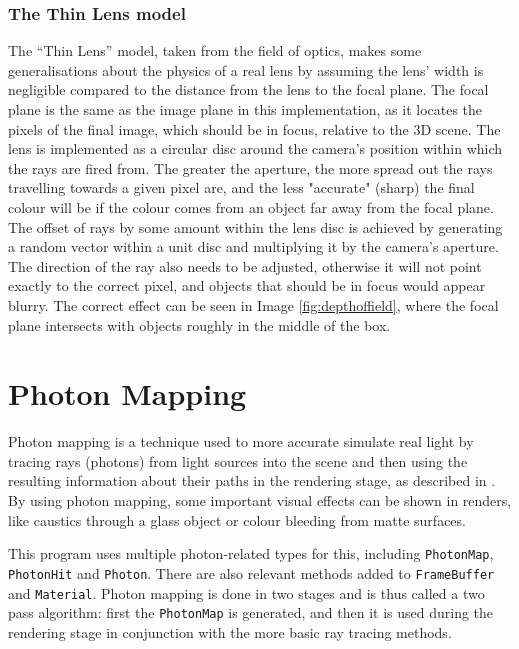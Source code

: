\documentclass[a4paper]{article}
\begin{document}
\subsubsection{The Thin Lens model}
The ``Thin Lens'' model, taken from the field of optics, makes some generalisations about the physics of a real lens by assuming the lens' width is negligible compared to the distance from the lens to the focal plane. The focal plane is the same as the image plane in this implementation, as it locates the pixels of the final image, which should be in focus, relative to the 3D scene. The lens is implemented as a circular disc around the camera's position within which the rays are fired from. The greater the aperture, the more spread out the rays travelling towards a given pixel are, and the less "accurate" (sharp) the final colour will be if the colour comes from an object far away from the focal plane.\\

The offset of rays by some amount within the lens disc is achieved by generating a random vector within a unit disc and multiplying it by the camera's aperture. The direction of the ray also needs to be adjusted, otherwise it will not point exactly to the correct pixel, and objects that should be in focus would appear blurry. The correct effect can be seen in Image \ref{fig:depthoffield}, where the focal plane intersects with objects roughly in the middle of the box.

\section{Photon Mapping}
Photon mapping is a technique used to more accurate simulate real light by tracing rays (photons) from light sources into the scene and then using the resulting information about their paths in the rendering stage, as described in \cite{Jensen1996photonmaps}. By using photon mapping, some important visual effects can be shown in renders, like caustics through a glass object or colour bleeding from matte surfaces.

This program uses multiple photon-related types for this, including \texttt{PhotonMap}, \texttt{PhotonHit} and \texttt{Photon}. There are also relevant methods added to \texttt{FrameBuffer} and \texttt{Material}. Photon mapping is done in two stages and is thus called a two pass algorithm: first the \texttt{PhotonMap} is generated, and then it is used during the rendering stage in conjunction with the more basic ray tracing methods.
\end{document}
